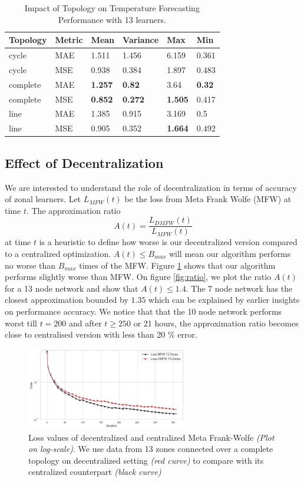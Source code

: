 \begin{table}[ht]
\begin{tabular}{|l|l|l|l|l|l|}
\hline
Topology & Metric & Mean & Variance & Max   & Min   \\ \hline
cycle    & MAE   & 1.511 & 1.456 & 6.159 & 0.361 \\ \hline
cycle    & MSE   & 0.938  & 0.384  & 1.897  & 0.483 \\ \hline
complete & MAE  & \textbf{1.257 }& \textbf{0.82} & 3.64 & \textbf{0.32} \\ \hline
complete & MSE   & \textbf{0.852} & \textbf{0.272} & \textbf{1.505} & 0.417 \\ \hline
line     & MAE   & 1.385 & 0.915 & 3.169 & 0.5 \\ \hline
line     & MSE   & 0.905 & 0.352 & \textbf{1.664} & 0.492 \\ \hline
\end{tabular}
\caption{Impact of Topology on Temperature Forecasting Performance with 13 learners.}
\label{table:temp13}
\end{table}




\subsection{Effect of Decentralization}

We are interested to understand the role of decentralization in terms of accuracy of zonal learners.
Let $L_{MFW}(t)$ be the loss from Meta Frank Wolfe (MFW) at time $t$.
The approximation ratio $$A(t) = \frac{L_{DMFW}(t) }{L_{MFW}(t)}$$ at time $t$ is a heuristic to define how worse is our decentralized version compared to a centralized optimization. 
$A(t) \leq B_{max}$ will mean our algorithm performs no worse than $B_{max}$ times of the MFW.
%
Figure \ref{fig:loss_baseline} shows that our algorithm performs slightly worse than MFW. On figure \ref{fig:ratio}, we plot the ratio $A(t)$ for a 13 node network and show that $A(t) \leq 1.4$. 
The 7 node network has the closest approximation bounded by $1.35$ which can be explained by earlier insights on performance accuracy.  
We notice that that the 10 node network performs worst till $t = 200$ and after  $t \geq 250 $ or 21 hours, the approximation ratio becomes close to centralised version with less than 20 $\%$ error.


\begin{figure}
    \centering
    \includegraphics[width=7cm]{./img/baseline-compare/loss5.png}
    \caption{Loss values of decentralized and centralized Meta Frank-Wolfe \textit{(Plot on log-scale)}. We use data from 13 zones connected over a complete topology on decentralized setting \textit{(red curve)} to compare with its centralized counterpart \textit{(black curve)}}
    \label{fig:loss_baseline}
\end{figure}

